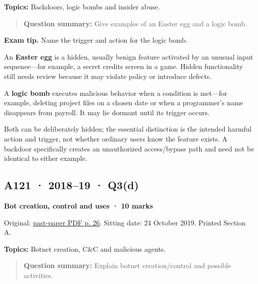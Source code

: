 \documentclass[11pt,a4paper]{article}
\begin{document}
\textbf{Topics:} Backdoors,\allowbreak{} logic bombs and insider abuse.



\begin{quote}\small

\textbf{Question summary:} Give examples of an Easter egg and a logic bomb.



\end{quote}


{\color{ForestGreen}\textbf{Exam tip.} Name the trigger and action for the logic bomb.}


An \textbf{Easter egg} is a hidden,\allowbreak{} usually benign feature activated by an unusual input sequence—for example,\allowbreak{} a secret credits screen in a game. Hidden functionality still needs review because it may violate policy or introduce defects.


A \textbf{logic bomb} executes malicious behavior when a condition is met—for example,\allowbreak{} deleting project files on a chosen date or when a programmer's name disappears from payroll. It may lie dormant until its trigger occurs.


Both can be deliberately hidden; the essential distinction is the intended harmful action and trigger,\allowbreak{} not whether ordinary users know the feature exists. A backdoor specifically creates an unauthorized access/\allowbreak{}bypass path and need not be identical to either example.




\clearpage
\subsection{A121 · 2018–19 · Q3(d)}\label{a121}

\textbf{Bot creation,\allowbreak{} control and uses · 10 marks}


Original: \href{../../CSE405-Security_Merged.pdf\#page=26}{past-paper PDF p. 26}. Sitting date: 24 October 2019. Printed Section A.


\textbf{Topics:} Botnet creation,\allowbreak{} C\&C and malicious agents.



\begin{quote}\small

\textbf{Question summary:} Explain botnet creation/\allowbreak{}control and possible activities.



\end{quote}
\end{document}
